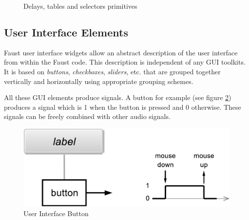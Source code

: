 \documentclass{article}
\begin{document}
\begin{figure}
\caption{Delays, tables and selectors primitives }
\label{fig:delays}
\end{figure}


\subsection{User Interface Elements}


Faust user interface widgets allow an abstract description of the user interface from within the Faust code. This description is
independent of any GUI toolkits. It is based on \emph{buttons}, \emph{checkboxes}, \emph{sliders}, etc. that are grouped together vertically and
horizontally using appropriate grouping schemes.

All these GUI elements produce signals. A button for example (see figure \ref{fig:button}) produces a signal which is 1 when the button is pressed and 0 otherwise.
These signals can be freely combined with other audio signals.

\begin{figure}[h]
\centering
\includegraphics[scale=0.5]{illustrations/button}
\caption{User Interface Button}
\label{fig:button}
\end{figure}


\vspace{5 mm}
\end{document}
